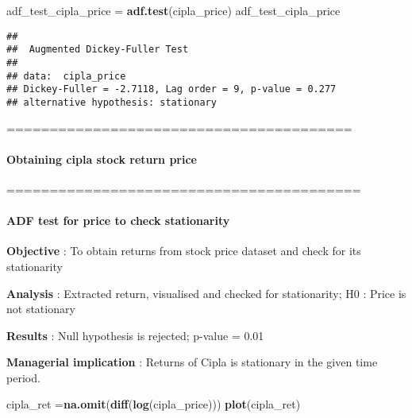\documentclass[
]{article}
\newenvironment{Shaded}{\begin{snugshade}}{\end{snugshade}}
\newcommand{\FunctionTok}[1]{\textcolor[rgb]{0.13,0.29,0.53}{\textbf{#1}}}
\newcommand{\NormalTok}[1]{#1}
\newcommand{\OtherTok}[1]{\textcolor[rgb]{0.56,0.35,0.01}{#1}}
\begin{document}
\begin{Shaded}
\begin{Highlighting}[]
\NormalTok{adf\_test\_cipla\_price }\OtherTok{=} \FunctionTok{adf.test}\NormalTok{(cipla\_price)}
\NormalTok{adf\_test\_cipla\_price}
\end{Highlighting}
\end{Shaded}

\begin{verbatim}
## 
##  Augmented Dickey-Fuller Test
## 
## data:  cipla_price
## Dickey-Fuller = -2.7118, Lag order = 9, p-value = 0.277
## alternative hypothesis: stationary
\end{verbatim}

========================================

\hypertarget{obtaining-cipla-stock-return-price}{%
\paragraph{\texorpdfstring{\textbf{Obtaining cipla stock return
price}}{Obtaining cipla stock return price}}\label{obtaining-cipla-stock-return-price}}

=========================================

\hypertarget{adf-test-for-price-to-check-stationarity-1}{%
\paragraph{\texorpdfstring{\textbf{ADF test for price to check
stationarity}}{ADF test for price to check stationarity}}\label{adf-test-for-price-to-check-stationarity-1}}

\textbf{Objective} : To obtain returns from stock price dataset and
check for its stationarity

\textbf{Analysis} : Extracted return, visualised and checked for
stationarity; H0 : Price is not stationary

\textbf{Results} : Null hypothesis is rejected; p-value = 0.01

\textbf{Managerial implication} : Returns of Cipla is stationary in the
given time period.

\begin{Shaded}
\begin{Highlighting}[]
\NormalTok{cipla\_ret }\OtherTok{=}\FunctionTok{na.omit}\NormalTok{(}\FunctionTok{diff}\NormalTok{(}\FunctionTok{log}\NormalTok{(cipla\_price)))}
\FunctionTok{plot}\NormalTok{(cipla\_ret)}
\end{Highlighting}
\end{Shaded}
\end{document}
